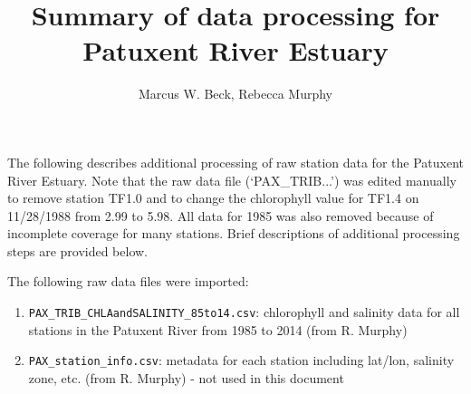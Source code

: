 \documentclass[letterpaper,12pt]{article}\usepackage[]{graphicx}\usepackage[]{color}
\begin{document}
\setlength{\parskip}{5mm}
\setlength{\parindent}{0in}

\title{Summary of data processing for Patuxent River Estuary}
\author{Marcus W. Beck, Rebecca Murphy}
\maketitle

The following describes additional processing of raw station data for the Patuxent River Estuary. Note that the raw data file (`PAX\_TRIB...') was edited manually to remove station TF1.0 and to change the chlorophyll value for TF1.4 on 11/28/1988 from 2.99 to 5.98.  All data for 1985 was also removed because of incomplete coverage for many stations.  Brief descriptions of additional processing steps are provided below.

The following raw data files were imported:
\begin{enumerate}
\item \texttt{PAX\_TRIB\_CHLAandSALINITY\_85to14.csv}: chlorophyll and salinity data for all stations in the Patuxent River from 1985 to 2014 (from R. Murphy)
\item \texttt{PAX\_station\_info.csv}: metadata for each station including lat/lon, salinity zone, etc. (from R. Murphy) - not used in this document
\end{enumerate}
\end{document}
